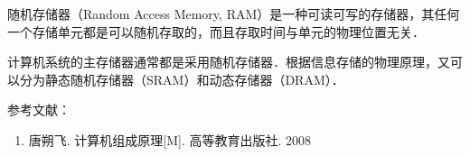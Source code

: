 
随机存储器（Random Access Memory, RAM）是一种可读可写的存储器，其任何一个存储单元都是可以随机存取的，而且存取时间与单元的物理位置无关．

计算机系统的主存储器通常都是采用随机存储器．根据信息存储的物理原理，又可以分为静态随机存储器（SRAM）和动态存储器（DRAM）．


参考文献：
\begin{enumerate}
\item 唐朔飞. 计算机组成原理[M]. 高等教育出版社. 2008
\end{enumerate}